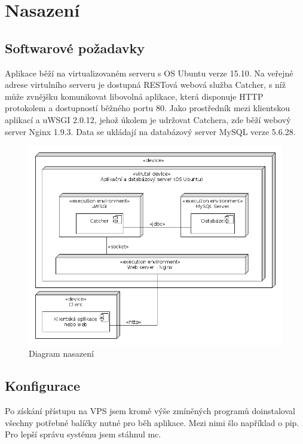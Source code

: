 \chapter{Nasazení}

\section{Softwarové požadavky}

Aplikace běží na virtualizovaném serveru s OS Ubuntu verze 15.10. Na veřejné adrese virtulního serveru
je dostupná RESTová webová služba Catcher, s níž může zvnějšku komunikovat libovolná aplikace,
která disponuje HTTP protokolem a dostupností běžného portu 80. Jako prostředník mezi klientskou aplikací
a uWSGI 2.0.12, jehož úkolem je udržovat Catchera, zde běží webový server Nginx 1.9.3.
Data se ukládají na databázový server MySQL verze 5.6.28.

\begin{figure}[ht!]
\centering
\includegraphics[width=130mm]{./images/diagram-nasazeni.png}
\caption{Diagram nasazení\label{overflow}}
\end{figure}

\section{Konfigurace}

Po získání přístupu na VPS jsem kromě výše zmíněných programů doinstaloval všechny potřebné balíčky nutné pro běh aplikace.
Mezi nimi šlo například o pip. Pro lepší správu systému jsem stáhnul mc.

